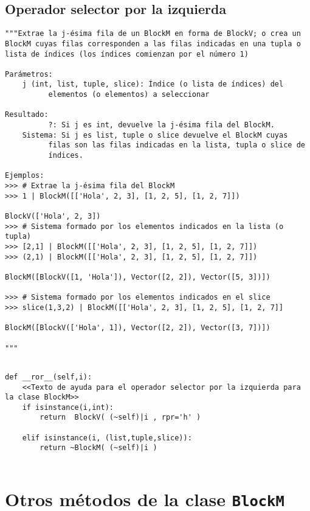 \documentclass[11pt]{report}
\begin{document}
\subsection{Operador selector por la izquierda}
\label{sec:orgdf70219}

\begin{verbatim}
"""Extrae la j-ésima fila de un BlockM en forma de BlockV; o crea un
BlockM cuyas filas corresponden a las filas indicadas en una tupla o
lista de índices (los índices comienzan por el número 1)

Parámetros:
    j (int, list, tuple, slice): Índice (o lista de índices) del 
          elementos (o elementos) a seleccionar

Resultado:
          ?: Si j es int, devuelve la j-ésima fila del BlockM.
    Sistema: Si j es list, tuple o slice devuelve el BlockM cuyas
          filas son las filas indicadas en la lista, tupla o slice de
          índices.

Ejemplos:
>>> # Extrae la j-ésima fila del BlockM 
>>> 1 | BlockM([['Hola', 2, 3], [1, 2, 5], [1, 2, 7]])

BlockV(['Hola', 2, 3])
>>> # Sistema formado por los elementos indicados en la lista (o tupla)
>>> [2,1] | BlockM([['Hola', 2, 3], [1, 2, 5], [1, 2, 7]])
>>> (2,1) | BlockM([['Hola', 2, 3], [1, 2, 5], [1, 2, 7]])

BlockM([BlockV([1, 'Hola']), Vector([2, 2]), Vector([5, 3])])

>>> # Sistema formado por los elementos indicados en el slice
>>> slice(1,3,2) | BlockM([['Hola', 2, 3], [1, 2, 5], [1, 2, 7]]

BlockM([BlockV(['Hola', 1]), Vector([2, 2]), Vector([3, 7])])

"""
\end{verbatim}

\begin{verbatim}

def __ror__(self,i):
    <<Texto de ayuda para el operador selector por la izquierda para la clase BlockM>>
    if isinstance(i,int):
        return  BlockV( (~self)|i , rpr='h' )

    elif isinstance(i, (list,tuple,slice)):        
        return ~BlockM( (~self)|i ) 
        
\end{verbatim}

\section{Otros métodos de la clase \texttt{BlockM}}
\label{sec:org90ce0de}
\end{document}
